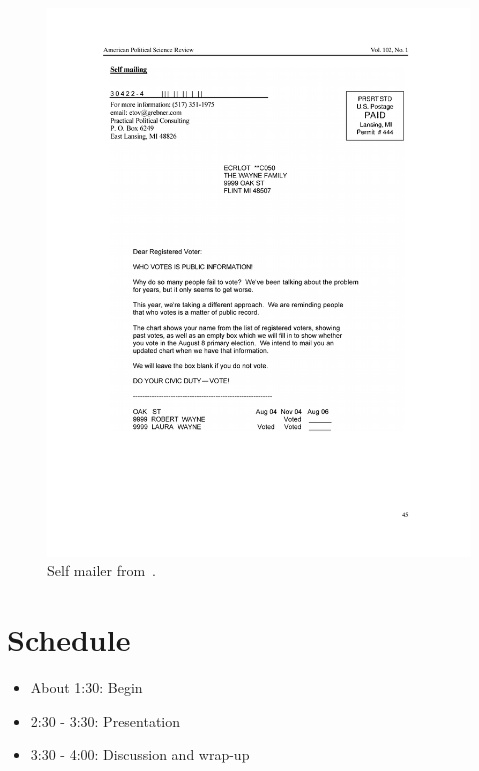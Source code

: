 \documentclass{article}
\begin{document}
\begin{figure}
\centering
\includegraphics[width=\textwidth]{figures/gerber_social_2008_self}
\caption{Self mailer from~\citet{gerber_social_2008}.}
\label{fig:gerber_social_2008_self}
\end{figure}

\section*{Schedule} 
 
\begin{itemize}
\item About 1:30: Begin
\item 2:30 - 3:30: Presentation
\item 3:30 - 4:00: Discussion and wrap-up
\end{itemize} 
 
 
 
 
 

\end{document}

